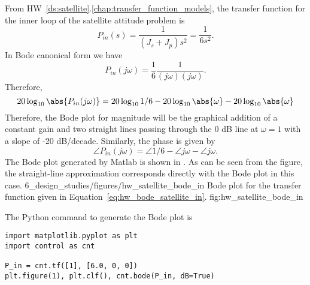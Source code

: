 From HW~\ref{ds:satellite}.\ref{chap:transfer_function_models}, the transfer function for the inner loop of the satellite attitude problem is 
\begin{equation}\label{eq:hw_bode_satellite_in_tf}
P_{in}(s) = \frac{1}{(J_s + J_p)s^2} = 
\frac{1}{6s^2}. 
\end{equation}
In Bode canonical form we have
\[
P_{in}(j\omega) = \frac{1}{6}\frac{1}{(j\omega)(j\omega)}.
\]
Therefore,
\begin{equation} \label{eq:hw_bode_satellite_in}
20\log_{10}\abs{P_{in}(j\omega)}=
	20\log_{10} 1/6-20\log_{10}\abs{\omega}-20\log_{10}\abs{\omega}
\end{equation}
Therefore, the Bode plot for magnitude will be the graphical addition of a constant gain and two straight lines passing through the 0 dB line at $\omega = 1$ with a slope of -20 dB/decade.
Similarly, the phase is given by
\[
\angle P_{in}(j\omega) = 
\angle 1/6 
- \angle j\omega - \angle j\omega.
\]
The Bode plot generated by Matlab is shown in . As can be seen from the figure, the straight-line approximation corresponds directly with the Bode plot in this case.
	{6_design_studies/figures/hw_satellite_bode_in}
	{Bode plot for the transfer function given in Equation~\eqref{eq:hw_bode_satellite_in}.}
	{fig:hw_satellite_bode_in}
	
The Python command to generate the Bode plot is
\begin{lstlisting}
import matplotlib.pyplot as plt
import control as cnt

P_in = cnt.tf([1], [6.0, 0, 0])
plt.figure(1), plt.clf(), cnt.bode(P_in, dB=True)
\end{lstlisting}

